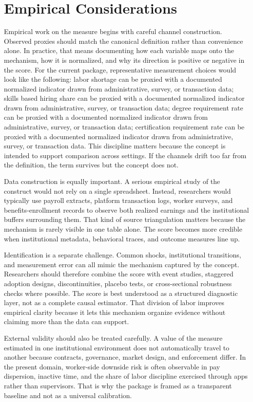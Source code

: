\documentclass[12pt]{article}
\begin{document}
\section{Empirical Considerations}
Empirical work on the measure begins with careful channel construction. Observed proxies should match the canonical definition rather than convenience alone. In practice, that means documenting how each variable maps onto the mechanism, how it is normalized, and why its direction is positive or negative in the score. For the current package, representative measurement choices would look like the following: labor shortage can be proxied with a documented normalized indicator drawn from administrative, survey, or transaction data; skills based hiring share can be proxied with a documented normalized indicator drawn from administrative, survey, or transaction data; degree requirement rate can be proxied with a documented normalized indicator drawn from administrative, survey, or transaction data; certification requirement rate can be proxied with a documented normalized indicator drawn from administrative, survey, or transaction data. This discipline matters because the concept is intended to support comparison across settings. If the channels drift too far from the definition, the term survives but the concept does not.

Data construction is equally important. A serious empirical study of the construct would not rely on a single spreadsheet. Instead, researchers would typically use payroll extracts, platform transaction logs, worker surveys, and benefits-enrollment records to observe both realized earnings and the institutional buffers surrounding them. That kind of source triangulation matters because the mechanism is rarely visible in one table alone. The score becomes more credible when institutional metadata, behavioral traces, and outcome measures line up.

Identification is a separate challenge. Common shocks, institutional transitions, and measurement error can all mimic the mechanism captured by the concept. Researchers should therefore combine the score with event studies, staggered adoption designs, discontinuities, placebo tests, or cross-sectional robustness checks where possible. The score is best understood as a structured diagnostic layer, not as a complete causal estimator. That division of labor improves empirical clarity because it lets this mechanism organize evidence without claiming more than the data can support.

External validity should also be treated carefully. A value of the measure estimated in one institutional environment does not automatically travel to another because contracts, governance, market design, and enforcement differ. In the present domain, worker-side downside risk is often observable in pay dispersion, inactive time, and the share of labor discipline exercised through apps rather than supervisors. That is why the package is framed as a transparent baseline and not as a universal calibration.
\end{document}
